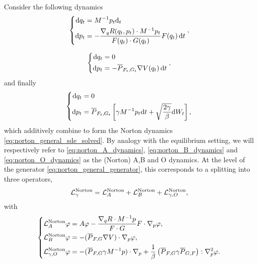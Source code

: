 \begin{definition}
    Consider the following dynamics
    \begin{equation}
        \label{eq:norton_A_dynamics}
        \left\{
            \begin{aligned}
                \mathrm{d} q_t &=M^{-1}p_t\mathrm{d}_t\\
                \mathrm{d} p_t &= -\frac{\nabla_q R(q_t,p_t)\cdot M^{-1}p_t}{F(q_t)\cdot G(q_t)}F(q_t)\,\mathrm{d} t
            \end{aligned}
        \right.,
    \end{equation}

    \begin{equation}
        \label{eq:norton_B_dynamics}
        \left\{
            \begin{aligned}
                \mathrm{d} q_t &= 0\\
                \mathrm{d} p_t &= -\overline{P}_{F_t,G_t}\nabla V(q_t)\,\mathrm{d} t
            \end{aligned}
        \right.,
    \end{equation}
    and finally
    \begin{equation}
        \label{eq:norton_O_dynamics}
        \left\{
            \begin{aligned}
                \mathrm{d} q_t &= 0\\
                \mathrm{d} p_t &= \overline{P}_{F_t,G_t}\left[\gamma M^{-1}p_t\mathrm{d} t +\sqrt{\frac{2\gamma}\beta}\mathrm{d} W_t\right],
            \end{aligned}
        \right.
    \end{equation}
    which additively combine to form the Norton dynamics \eqref{eq:norton_general_sde_solved}. By analogy with the equilibrium setting, we will respectively refer to \eqref{eq:norton_A_dynamics}, \eqref{eq:norton_B_dynamics} and \eqref{eq:norton_O_dynamics} as the (Norton) A,B and O dynamics.
    At the level of the generator \eqref{eq:norton_general_generator}, this corresponds to a splitting into three operators,
    \[\mathcal{L}_\gamma^{\mathrm{Norton}}=\mathcal{L}_{A}^{\mathrm{Norton}}+\mathcal{L}_{B}^{\mathrm{Norton}}+\mathcal{L}_{\gamma,O}^{\mathrm{Norton}},\]
    with
    \begin{equation}
        \label{eq:norton_generator_splitting}
        \left\{
            \begin{aligned}
                \mathcal{L}_{A}^{\mathrm{Norton}}\varphi &= A\varphi -\frac{\nabla_q R\cdot M^{-1}p}{F\cdot G}F\cdot \nabla_p \varphi,\\
                \mathcal{L}_{B}^{\mathrm{Norton}}\varphi &= -(\overline{P}_{F,G}\nabla V)\cdot \nabla_p \varphi,\\
                \mathcal{L}_{\gamma,O}^{\mathrm{Norton}}\varphi &= -(\overline{P}_{F,G}\gamma M^{-1}p)\cdot \nabla_p+\frac1\beta \left(\overline{P}_{F,G}\gamma\overline{P}_{G,F}\right):\nabla_p^2\varphi.
            \end{aligned}
        \right.
    \end{equation}
\end{definition}

